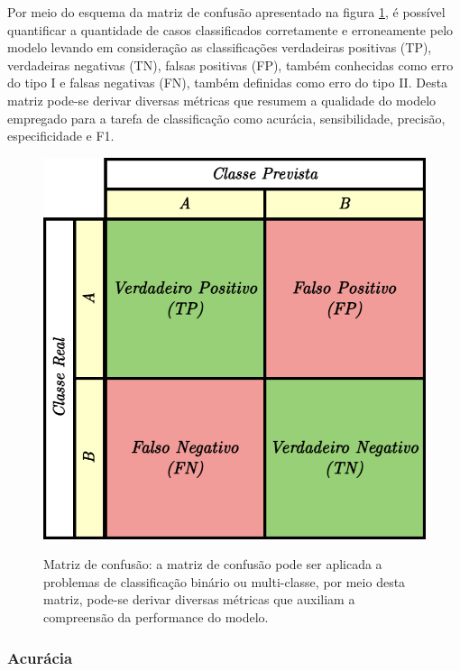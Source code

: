 Por meio do esquema da matriz de confusão apresentado na figura \ref{fig:matriz-de-confusao}, é possível quantificar a quantidade de casos classificados corretamente e erroneamente pelo modelo levando em consideração as classificações verdadeiras positivas (TP), verdadeiras negativas (TN), falsas positivas (FP), também conhecidas como erro do tipo I e falsas negativas (FN), também definidas como erro do tipo II.
Desta matriz pode-se derivar diversas métricas que resumem a qualidade do modelo empregado para a tarefa de classificação como acurácia, sensibilidade, precisão, especificidade e F1.

\begin{figure}[htbp]
	\centering
	\caption{Matriz de confusão: a matriz de confusão pode ser aplicada a problemas de classificação binário ou multi-classe, por meio desta matriz, pode-se derivar diversas métricas que auxiliam a compreensão da performance do modelo. }
		\includegraphics[scale=.25]{imagens/matriz-de-confusao.png}
	\label{fig:matriz-de-confusao}
\end{figure}

\subsubsection{Acurácia}

